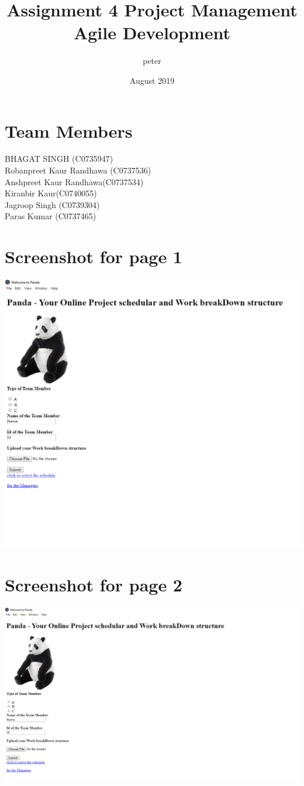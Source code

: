\documentclass{article}
\title{Assignment 4 Project Management Agile Development}
\author{peter }
\date{August 2019}
\begin{document}
\maketitle

\section{Team Members}
BHAGAT SINGH (C0735947)\\
Robanpreet Kaur Randhawa  (C0737536)\\
Anshpreet Kaur Randhawa(C0737534)\\
Kiranbir Kaur(C0740055)\\
Jagroop Singh (C0739304)\\
Paras Kumar (C0737465)\\
\section *{Screenshot for page 1}
\includegraphics[width=20cm]{1.PNG}
\section *{Screenshot for page 2}
\includegraphics[width=20cm]{2.PNG}
\end{document}
